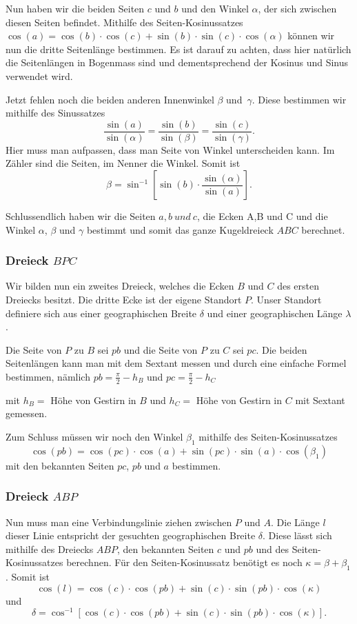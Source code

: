 Nun haben wir die beiden Seiten $c$ und $b$ und den Winkel $\alpha$, der sich zwischen diesen Seiten befindet. 
Mithilfe des Seiten-Kosinussatzes 
$\cos(a) = \cos(b)\cdot \cos(c) + \sin(b) \cdot \sin(c)\cdot \cos(\alpha)$ 
können wir nun die dritte Seitenlänge bestimmen. 
Es ist darauf zu achten, dass hier natürlich die Seitenlängen in Bogenmass sind und dementsprechend der Kosinus und Sinus verwendet wird. 

Jetzt fehlen noch die beiden anderen Innenwinkel $\beta$ und\ $\gamma$.
Diese bestimmen wir mithilfe des Sinussatzes \[\frac{\sin (a)}{\sin (\alpha)} =\frac{\sin (b)}{\sin (\beta)} = \frac{\sin (c)}{\sin (\gamma)}.\]
Hier muss man aufpassen, dass man Seite von Winkel unterscheiden kann. 
Im Zähler sind die Seiten, im Nenner die Winkel. 
Somit ist \[\beta =\sin^{-1} [\sin(b) \cdot \frac{\sin(\alpha)}{\sin(a)}].\]

Schlussendlich haben wir die Seiten $a,b\ und \ c$, die Ecken A,B und C und die Winkel $\alpha$, $\beta$  und  $\gamma$ bestimmt und somit das ganze Kugeldreieck $ABC$ berechnet.

\subsubsection{Dreieck $BPC$}
Wir bilden nun ein zweites Dreieck, welches die Ecken $B$ und $C$ des ersten Dreiecks besitzt. 
Die dritte Ecke ist der eigene Standort $P$.
Unser Standort definiere sich aus einer geographischen Breite $\delta$ und einer geographischen Länge $\lambda$. 

Die Seite von $P$ zu $B$ sei $pb$ und die Seite von $P$ zu $C$ sei $pc$.
Die beiden Seitenlängen kann man mit dem Sextant messen und durch eine einfache Formel bestimmen, nämlich $pb=\frac{\pi}{2} - h_{B}$ und $pc=\frac{\pi}{2} - h_{C}$ 

mit $h_B=$ Höhe von Gestirn in $B$ und $h_C=$ Höhe von Gestirn in $C$ mit Sextant gemessen.

Zum Schluss müssen wir noch den Winkel $\beta_1$ mithilfe des Seiten-Kosinussatzes \[\cos(pb)=\cos(pc)\cdot\cos(a)+\sin(pc)\cdot\sin(a)\cdot\cos(\beta_1)\]  mit den bekannten Seiten $pc$, $pb$ und $a$ bestimmen. 
\subsubsection{Dreieck $ABP$}
Nun muss man eine Verbindungslinie ziehen zwischen $P$ und $A$. Die Länge $l$ dieser Linie entspricht der gesuchten geographischen Breite $\delta$. Diese lässt sich mithilfe des Dreiecks $ABP$, den bekannten Seiten $c$ und $pb$ und des Seiten-Kosinussatzes berechnen.
Für den Seiten-Kosinussatz benötigt es noch $\kappa=\beta + \beta_1$.
Somit ist \[\cos(l) = \cos(c)\cdot \cos(pb) + \sin(c) \cdot \sin(pb) \cdot \cos(\kappa)\]
und
\[
\delta  =\cos^{-1} [\cos(c) \cdot \cos(pb) + \sin(c) \cdot \sin(pb) \cdot \cos(\kappa)].
\]

